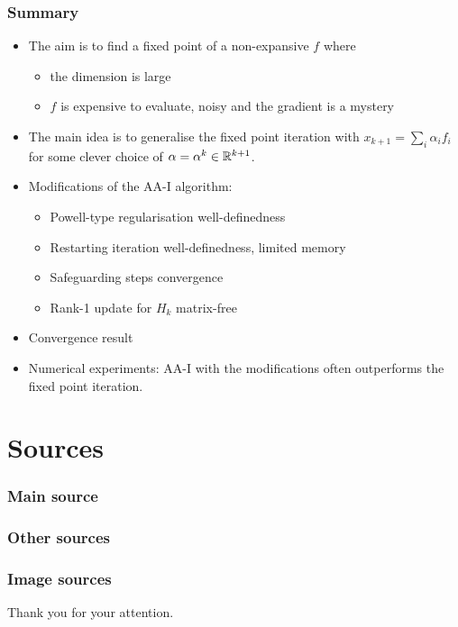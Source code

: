 \begin{frame}
	\frametitle{Summary}
	\begin{itemize}
		\item The aim is to find a fixed point of a non-expansive $f$ where
		\begin{itemize}
			\item the dimension is large
			\item $f$ is expensive to evaluate, noisy and the gradient is a mystery
		\end{itemize}
		\item The main idea is to generalise the fixed point iteration with $x_{k+1}=\sum_i\alpha_if_i$ for some clever choice of $\alpha=\alpha^k\in\mathbb{R}^{k+1}$.
		\item Modifications of the AA-I algorithm:
		\begin{itemize}
			\item Powell-type regularisation \textrightarrow well-definedness
			\item Restarting iteration \textrightarrow well-definedness, limited memory
			\item Safeguarding steps \textrightarrow convergence
			\item Rank-1 update for $H_k$ \textrightarrow matrix-free
		\end{itemize}
		\item Convergence result
		\item Numerical experiments: AA-I with the modifications often outperforms the fixed point iteration.
	\end{itemize}
\end{frame}

\section*{Sources}

\nocite{*}

\begin{frame}
	\frametitle{Main source}
%	
%	
	\printbibliography[title={Main source},keyword={main}]
\end{frame}

\begin{frame}
	\frametitle{Other sources}
	\printbibliography[keyword={secondary}, title={Other sources}]
\end{frame}

\begin{frame}
	\frametitle{Image sources}
	\printbibliography[title={Image sources}, keyword={image}]
\end{frame}


\begin{frame}[plain]
	\begin{center}
		\Large{{Thank you for your attention.}}
	\end{center}
\end{frame}



